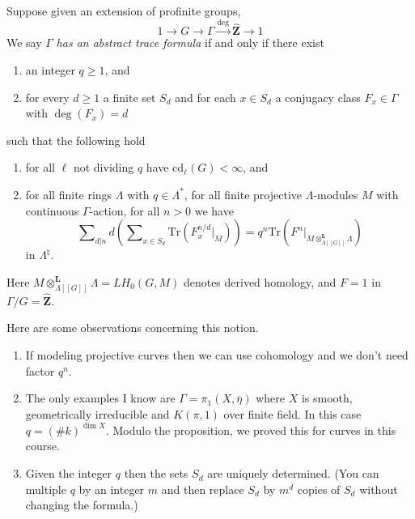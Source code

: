 \noindent
Suppose given an extension of profinite groups,
$$
1 \to G \to \Gamma \xrightarrow{\deg} \widehat{\mathbf{Z}} \to 1
$$
We say $\Gamma$ {\it has an abstract trace formula} if and only if
there exist
\begin{enumerate}
\item an integer $q\geq 1$, and
\item for every $d\geq 1$ a finite set $S_d$ and for each $x\in S_d$ a
conjugacy class $F_x \in \Gamma$ with $\deg(F_x) = d$
\end{enumerate}
such that the following hold
\begin{enumerate}
\item for all $\ell$ not dividing $q$ have $\text{cd}_\ell(G)<\infty$, and
\item for all finite rings $\Lambda$ with $q\in \Lambda^*$,
for all finite projective $\Lambda$-modules $M$ with continuous
$\Gamma$-action, for all $n > 0$ we have
$$
\sum\nolimits_{d|n}d \left(
\sum\nolimits_{x \in S_d}
\text{Tr}( F_x^{n/d} |_M)
\right)
=
q^n \text{Tr}(F^n|_{M \otimes_{\Lambda[[G]]}^{\mathbf{L}}\Lambda})
$$
in $\Lambda^\natural$.
\end{enumerate}
Here $M \otimes_{\Lambda[[G]]}^{\mathbf{L}}\Lambda = LH_0(G, M)$ denotes
derived homology, and $F=1$ in $\Gamma/G = \widehat{\mathbf{Z}}$.

\begin{remark}
\label{remark-abstract-trace-formula}
Here are some observations concerning this notion.
\begin{enumerate}
\item If modeling projective curves then we can use cohomology and we
don't need factor $q^n$.
\item The only examples I know are $\Gamma = \pi_1(X, \overline \eta)$
where $X$ is smooth, geometrically irreducible and $K(\pi, 1)$ over finite
field. In this case $q = (\# k)^{\dim X}$. Modulo the proposition, we proved
this for curves in this course.
\item Given the integer $q$ then the sets $S_d$ are uniquely
determined. (You can multiple $q$ by an integer $m$ and then replace $S_d$ by
$m^d$ copies of $S_d$ without changing the formula.)
\end{enumerate}
\end{remark}

